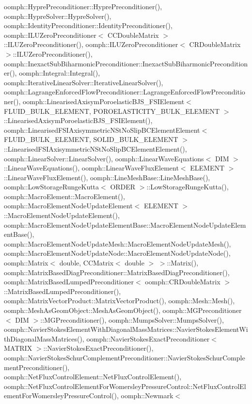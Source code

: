 oomph\+::\+Hypre\+Preconditioner\+::\+Hypre\+Preconditioner(), oomph\+::\+Hypre\+Solver\+::\+Hypre\+Solver(), oomph\+::\+Identity\+Preconditioner\+::\+Identity\+Preconditioner(), oomph\+::\+I\+L\+U\+Zero\+Preconditioner$<$ C\+C\+Double\+Matrix $>$\+::\+I\+L\+U\+Zero\+Preconditioner(), oomph\+::\+I\+L\+U\+Zero\+Preconditioner$<$ C\+R\+Double\+Matrix $>$\+::\+I\+L\+U\+Zero\+Preconditioner(), oomph\+::\+Inexact\+Sub\+Biharmonic\+Preconditioner\+::\+Inexact\+Sub\+Biharmonic\+Preconditioner(), oomph\+::\+Integral\+::\+Integral(), oomph\+::\+Iterative\+Linear\+Solver\+::\+Iterative\+Linear\+Solver(), oomph\+::\+Lagrange\+Enforced\+Flow\+Preconditioner\+::\+Lagrange\+Enforced\+Flow\+Preconditioner(), oomph\+::\+Linearised\+Axisym\+Poroelastic\+B\+J\+S\+\_\+\+F\+S\+I\+Element$<$ F\+L\+U\+I\+D\+\_\+\+B\+U\+L\+K\+\_\+\+E\+L\+E\+M\+E\+N\+T, P\+O\+R\+O\+E\+L\+A\+S\+T\+I\+C\+I\+T\+Y\+\_\+\+B\+U\+L\+K\+\_\+\+E\+L\+E\+M\+E\+N\+T $>$\+::\+Linearised\+Axisym\+Poroelastic\+B\+J\+S\+\_\+\+F\+S\+I\+Element(), oomph\+::\+Linearised\+F\+S\+I\+Axisymmetric\+N\+St\+No\+Slip\+B\+C\+Element\+Element$<$ F\+L\+U\+I\+D\+\_\+\+B\+U\+L\+K\+\_\+\+E\+L\+E\+M\+E\+N\+T, S\+O\+L\+I\+D\+\_\+\+B\+U\+L\+K\+\_\+\+E\+L\+E\+M\+E\+N\+T $>$\+::\+Linearised\+F\+S\+I\+Axisymmetric\+N\+St\+No\+Slip\+B\+C\+Element\+Element(), oomph\+::\+Linear\+Solver\+::\+Linear\+Solver(), oomph\+::\+Linear\+Wave\+Equations$<$ D\+I\+M $>$\+::\+Linear\+Wave\+Equations(), oomph\+::\+Linear\+Wave\+Flux\+Element$<$ E\+L\+E\+M\+E\+N\+T $>$\+::\+Linear\+Wave\+Flux\+Element(), oomph\+::\+Line\+Mesh\+Base\+::\+Line\+Mesh\+Base(), oomph\+::\+Low\+Storage\+Runge\+Kutta$<$ O\+R\+D\+E\+R $>$\+::\+Low\+Storage\+Runge\+Kutta(), oomph\+::\+Macro\+Element\+::\+Macro\+Element(), oomph\+::\+Macro\+Element\+Node\+Update\+Element$<$ E\+L\+E\+M\+E\+N\+T $>$\+::\+Macro\+Element\+Node\+Update\+Element(), oomph\+::\+Macro\+Element\+Node\+Update\+Element\+Base\+::\+Macro\+Element\+Node\+Update\+Element\+Base(), oomph\+::\+Macro\+Element\+Node\+Update\+Mesh\+::\+Macro\+Element\+Node\+Update\+Mesh(), oomph\+::\+Macro\+Element\+Node\+Update\+Node\+::\+Macro\+Element\+Node\+Update\+Node(), oomph\+::\+Matrix$<$ double, C\+C\+Matrix$<$ double $>$ $>$\+::\+Matrix(), oomph\+::\+Matrix\+Based\+Diag\+Preconditioner\+::\+Matrix\+Based\+Diag\+Preconditioner(), oomph\+::\+Matrix\+Based\+Lumped\+Preconditioner$<$ oomph\+::\+C\+R\+Double\+Matrix $>$\+::\+Matrix\+Based\+Lumped\+Preconditioner(), oomph\+::\+Matrix\+Vector\+Product\+::\+Matrix\+Vector\+Product(), oomph\+::\+Mesh\+::\+Mesh(), oomph\+::\+Mesh\+As\+Geom\+Object\+::\+Mesh\+As\+Geom\+Object(), oomph\+::\+M\+G\+Preconditioner$<$ D\+I\+M $>$\+::\+M\+G\+Preconditioner(), oomph\+::\+Mumps\+Solver\+::\+Mumps\+Solver(), oomph\+::\+Navier\+Stokes\+Element\+With\+Diagonal\+Mass\+Matrices\+::\+Navier\+Stokes\+Element\+With\+Diagonal\+Mass\+Matrices(), oomph\+::\+Navier\+Stokes\+Exact\+Preconditioner$<$ M\+A\+T\+R\+I\+X $>$\+::\+Navier\+Stokes\+Exact\+Preconditioner(), oomph\+::\+Navier\+Stokes\+Schur\+Complement\+Preconditioner\+::\+Navier\+Stokes\+Schur\+Complement\+Preconditioner(), oomph\+::\+Net\+Flux\+Control\+Element\+::\+Net\+Flux\+Control\+Element(), oomph\+::\+Net\+Flux\+Control\+Element\+For\+Womersley\+Pressure\+Control\+::\+Net\+Flux\+Control\+Element\+For\+Womersley\+Pressure\+Control(), oomph\+::\+Newmark$<$ 
